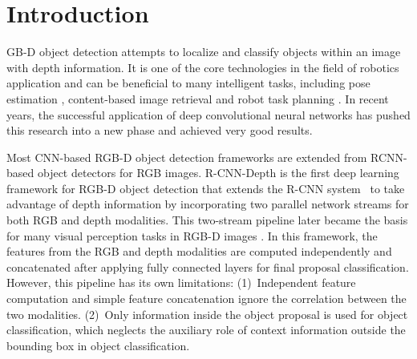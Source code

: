 \documentclass[journal]{IEEEtran}
\begin{document}
\section{Introduction}
% 
% 
% 
% 
GB-D object detection attempts to localize and classify objects within an image with depth information. It is one of the core technologies in the field of robotics application and can be beneficial to many intelligent tasks, including pose estimation \cite{hinterstoisser2012model, wang2016human}, content-based image retrieval \cite{wu2014hierarchical} and robot task planning \cite{schuster2015generating}. In recent years, the successful application of deep convolutional neural networks has pushed this research into a new phase and achieved very good results.

Most CNN-based RGB-D object detection frameworks are extended from RCNN-based object detectors \cite{girshick2014rich, fast-rcnn, ren2015faster} for RGB images. R-CNN-Depth \cite{gupta2014learning} is the first deep learning framework for RGB-D object detection that extends the R-CNN system~\cite{girshick2014rich} to take advantage of depth information by incorporating two parallel network streams for both RGB and depth modalities. %
 This two-stream pipeline later became the basis for many visual perception tasks in RGB-D images \cite{eitel2015multimodal, gupta2016cross, schwarz2015rgb, li2016lstm}. In this framework, the features from the RGB and depth modalities are computed independently and concatenated after applying fully connected layers for final proposal classification. However, this pipeline has its own limitations: (1)~Independent feature computation and simple feature concatenation ignore the correlation between the two modalities. (2)~Only information inside the object proposal is used for object classification, which neglects the auxiliary role of context information outside the bounding box in object classification.
\end{document}
